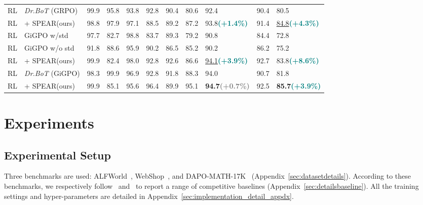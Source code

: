 \documentclass[]{youtu} %
\newcommand{\method}{\textsc{SPEAR}\xspace}
\begin{document}
\begin{table}[htbp]
{{{\begin{tabular}{lllllllllll}
\rowcolor[gray]{.95}
RL & \textit{Dr.BoT} (GRPO) & 99.9 & 95.8 & 93.8 & 92.8 & 90.4 & 80.6 & 92.4  & 90.4  & 80.5 \\
\rowcolor{c2}
RL & + \method (ours) & 98.8 & 97.9 & 97.1 & 88.5 & 89.2 & 87.2 & 93.8{\tiny \textbf{\textcolor{teal}{(+1.4\%)}}} & 91.4 & \underline{84.8}{\tiny \textbf{\textcolor{teal}{(+4.3\%)}}} \\
RL & GiGPO w/std & 97.7 & 82.7 & 98.8 & 83.7 & 89.3 & 79.2 & 90.8 & 84.4 & 72.8 \\
\rowcolor[gray]{.95}
RL & GiGPO w/o std & 91.8 & 88.6 & 95.9 & 90.2 & 86.5 & 85.2 & 90.2 & 86.2 & 75.2 \\
\rowcolor{c2}
RL & + \method (ours) & 99.9 & 82.4 & 98.0 & 92.8 & 92.6 & 86.6 & \underline{94.1}{\tiny \textbf{\textcolor{teal}{(+3.9\%)}}} & 92.7 & 83.8{\tiny \textbf{\textcolor{teal}{(+8.6\%)}}} \\
\rowcolor[gray]{.95}
RL & \textit{Dr.BoT} (GiGPO) & 98.3 & 99.9 & 96.9 & 92.8 & 91.8 & 88.3 & 94.0  &  90.7  &  81.8  \\
\rowcolor{c2}
RL & + \method (ours) & 99.9 & 85.1 & 95.6  & 96.4  & 89.9  &  95.1  &  \textbf{94.7}{\tiny \textbf{\textcolor{gray}{(+0.7\%)}}}  & 92.5 & \textbf{85.7}{\tiny \textbf{\textcolor{teal}{(+3.9\%)}}} \\
\bottomrule
\end{tabular}
}}}
\end{table}





\section{Experiments}

\subsection{Experimental Setup}

\label{sec:dataset}
Three benchmarks are used:
ALFWorld~\cite{shridhar2020alfworld},
WebShop~\cite{yao2022webshop},
and DAPO-MATH-17K~\cite{yu2025dapo} (Appendix~\ref{sec:datasetdetails}).
\label{sec:baseline}
According to these benchmarks,
we respectively follow~\cite{feng2025group} and~\cite{feng2025retool} to report a range of competitive baselines (Appendix~\ref{sec:detailsbaseline}).
\label{sec:implementation}
All the training settings and hyper-parameters are detailed in Appendix~\ref{sec:implementation_detail_appdx}.
\end{document}

